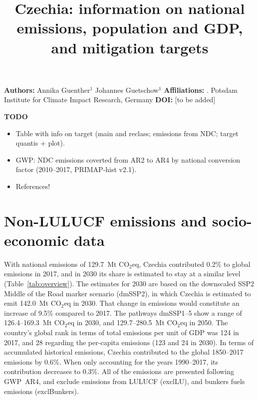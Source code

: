 \documentclass[12pt]{article}
\title{ \bfseries \color{PIKorange} Czechia: information on national emissions, population and GDP, and mitigation targets}
\begin{document}
 \maketitle

 \noindent \textbf{Authors:} \newline
 \indent Annika Guenther$^{1}$ \newline
 \indent Johannes Guetschow$^{1}$ \newline
 \noindent \textbf{Affiliations:} \newline
 . Potsdam Institute for Climate Impact Research, Germany \newline
 \noindent \textbf{DOI:} [to be added] \newline

 \textbf{TODO}
 \begin{itemize}
 \item Table with info on target (main and reclass; emissions from NDC; target quantis + plot).
 \item GWP: NDC emissions coverted from AR2 to AR4 by national conversion factor (2010--2017, PRIMAP-hist v2.1).
 \item References!
 \end{itemize}

 \newpage %
 \section{Non-LULUCF emissions and socio-economic data}
 \label{sec:nonLULUCFSocioEco}
 With national emissions of 129.7~Mt CO$_2$eq, Czechia contributed 0.2\% to global emissions in 2017, and in 2030 its share is estimated to stay at a similar level (Table~\ref{tab:overview}).
 The estimates for 2030 are based on the downscaled SSP2 Middle of the Road marker scenario (dmSSP2), in which Czechia is estimated to emit 142.0~Mt CO$_2$eq in 2030.
 That change in emissions would constitute an increase of 9.5\% compared to 2017. 
 The pathways dmSSP1--5 show a range of 126.4--169.3~Mt CO$_2$eq in 2030, and 129.7--280.5~Mt CO$_2$eq in 2050.
 The country's global rank in terms of total emissions per unit of GDP was 124 in 2017, and 28 regarding the per-capita emissions (123 and 24 in 2030).
 In terms of accumulated historical emissions, Czechia contributed to the global 1850--2017 emissions by 0.6\%. 
 When only accounting for the years 1990--2017, its contribution decreases to 0.3\%.
 All of the emissions are presented following GWP~AR4, and exclude emissions from LULUCF (exclLU), and bunkers fuels emissions (exclBunkers).
\end{document}

